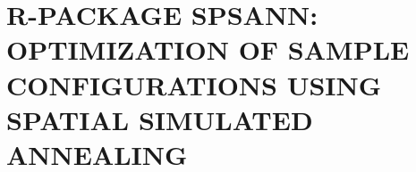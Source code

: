 \artigofalse
\chapter{R-PACKAGE SPSANN: OPTIMIZATION OF SAMPLE CONFIGURATIONS USING SPATIAL SIMULATED ANNEALING}
\label{appen:spsann}



% 
% 
% 
% 
% 
% 

